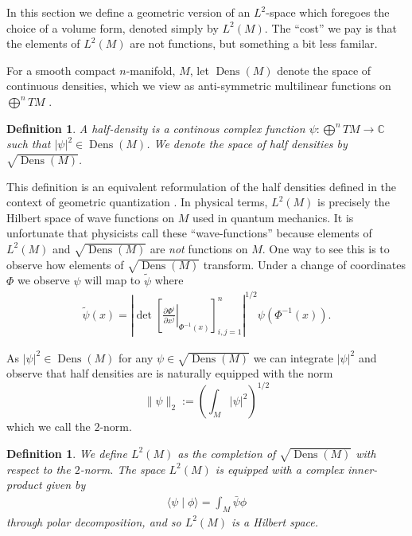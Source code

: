 \documentclass[final,leqno]{siamltex1213}
\newcommand{\pder}[2]{\ensuremath{\frac{ \partial #1}{\partial #2}}}
\newtheorem{defn}[thm]{Definition}
\DeclareMathOperator{\Dens}{Dens}
\begin{document}
In this section we define a geometric version of an $L^{2}$-space which foregoes the choice of a volume form, denoted simply by $L^{2}(M)$.
The ``cost'' we pay is that the elements of $L^{2}(M)$ are not functions, but something a bit less familar.

For a smooth compact $n$-manifold, $M$,
let $\Dens(M)$ denote the space of continuous densities,
which we view as anti-symmetric multilinear functions on $\bigoplus^n TM$ \cite[Chapter 16]{Lee2006}.

\begin{defn}\label{def:half density}
	A half-density is a continous complex function $\psi : \bigoplus^n TM \to \mathbb{C}$
	such that $| \psi |^{2} \in \Dens(M)$.
	We denote the space of half densities by $\sqrt{\Dens(M)}$.
\end{defn}

This definition is an equivalent reformulation of the half densities defined in the context of geometric quantization \cite{GuilleminSternberg1970,BatesWeinstein1997}.
In physical terms, $L^{2}(M)$ is precisely the Hilbert space of wave functions on $M$ used in quantum mechanics.
It is unfortunate that physicists call these ``wave-functions''
because elements of $L^{2}(M)$ and $\sqrt{\Dens(M)}$ are \emph{not} functions on $M$.
One way to see this is to observe how elements of $\sqrt{\Dens(M)}$ transform.
Under a change of coordinates $\Phi$ we observe $\psi$ will map to $\tilde \psi$ where
\begin{align}
	\tilde{\psi}(x)  =  \left| \det \left[ \left. \pder{\Phi^{i}}{x^{j}} \right|_{\Phi^{-1}(x)} \right]_{i,j=1}^{n} \right|^{1/2} \psi( \Phi^{-1}(x) ). \label{eq:transformation law}
\end{align}


As $|\psi|^{2} \in \Dens(M)$ for any $\psi \in \sqrt{\Dens(M)}$ we can integrate $|\psi|^{2}$
and observe that half densities are is naturally equipped with the norm $$\| \psi \|_2 :=  \left( \int_M |\psi|^2 \right)^{1/2}$$ which we call the $2$-norm.

\begin{defn}
	We define $L^{2}(M)$ as the completion of $\sqrt{ \Dens(M)}$ with respect to the $2$-norm.
	The space $L^{2}(M)$ is equipped with a complex inner-product given by
	\begin{align}
		\langle \psi \mid \phi \rangle = \int_{M} \bar \psi \phi
	\end{align}
	through polar decomposition, and so $L^{2}(M)$ is a Hilbert space.
\end{defn}
\end{document}
